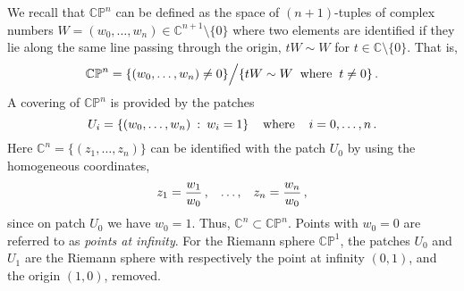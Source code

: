 \documentclass[dvipsnames,preprint,12pt,sort&compress]{elsarticle}
\begin{document}
We recall that $\mathbb{CP}^n$ can be defined as the space of $(n+1)$-tuples of
complex numbers $W = (w_0, \ldots, w_n) \in \mathbb{C}^{n+1}\setminus\{0\}$
where two elements are identified if they lie along the same line passing through
the origin, $tW \sim W$ for $t\in \mathbb{C}\setminus\{ 0 \}$. That is,
\begin{equation}
\mathbb{CP}^n = \{ (w_0,\ldots,w_n) \neq 0 \} \Big/ \{ tW \sim W  \hspace{2mm} \mathrm{where} \hspace{2mm} t \neq 0\} \,.
\end{equation}
A covering of $\mathbb{CP}^n$ is provided by the patches
\begin{equation}
U_i = \{ (w_0,\ldots,w_n) \hspace{0.8mm} : \hspace{0.8mm} w_i = 1 \}
\hspace{4mm} \mathrm{where} \hspace{4mm} i = 0, \ldots, n \,.
\label{eq:patches_on_CPn}
\end{equation}
Here $\mathbb{C}^n = \{ (z_1,\ldots,z_n) \}$ can be identified with the patch
$U_0$ by using the homogeneous coordinates,
\begin{equation}
z_1 = \frac{w_1}{w_0}\,, \hspace{3mm} \ldots, \hspace{3mm} z_n = \frac{w_n}{w_0}\,,
\label{eq:homogeneous_coords}
\end{equation}
since on patch $U_0$ we have $w_0 = 1$. Thus, $\mathbb{C}^n \subset \mathbb{CP}^n$.
Points with $w_0 = 0$ are referred to as \emph{points at infinity}.
For the Riemann sphere $\mathbb{CP}^1$, the patches $U_0$ and $U_1$ are
the Riemann sphere with respectively the point at infinity $(0,1)$,
and the origin $(1,0)$, removed.
\end{document}
